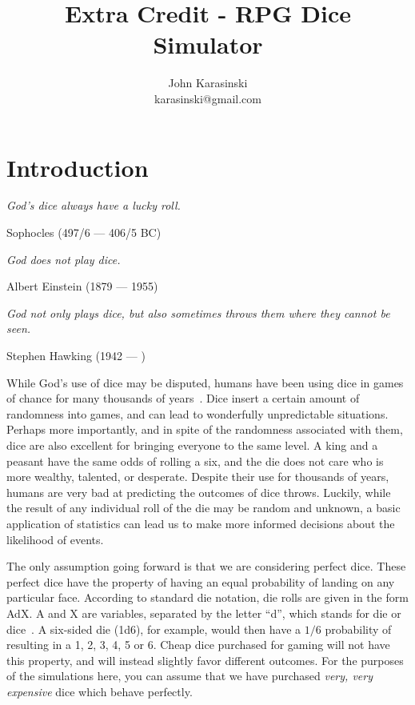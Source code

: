 \documentclass[twocolumn,letterpaper]{article}  %
\begin{document}
\title{Extra Credit - RPG Dice Simulator}
\author{%
John Karasinski\\
karasinski@gmail.com
}
\date{}

\maketitle

\thispagestyle{plain}
\pagestyle{plain}

\section{Introduction}

\epigraph{\small\itshape God's dice always have a lucky roll.}{Sophocles (497/6 --- 406/5 BC)}%
\vspace{-2em}
\epigraph{\small\itshape God does not play dice.}{Albert Einstein (1879 --- 1955)}%
\vspace{-2em}
\epigraph{\small\itshape God not only plays dice, but also sometimes throws them where they cannot be seen.}{Stephen Hawking (1942 --- \hspace{1.5em})}%

While God's use of dice may be disputed, humans have been using dice in games of chance for many thousands of years~\cite{history}. Dice insert a certain amount of randomness into games, and can lead to wonderfully unpredictable situations. Perhaps more importantly, and in spite of the randomness associated with them, dice are also excellent for bringing everyone to the same level. A king and a peasant have the same odds of rolling a six, and the die does not care who is more wealthy, talented, or desperate. Despite their use for thousands of years, humans are very bad at predicting the outcomes of dice throws. Luckily, while the result of any individual roll of the die may be random and unknown, a basic application of statistics can lead us to make more informed decisions about the likelihood of events.

The only assumption going forward is that we are considering perfect dice. These perfect dice have the property of having an equal probability of landing on any particular face. According to standard die notation, die rolls are given in the form AdX. A and X are variables, separated by the letter ``d'', which stands for die or dice~\cite{dice_notation}. A six-sided die (1d6), for example, would then have a $1/6$ probability of resulting in a 1, 2, 3, 4, 5 or 6. Cheap dice purchased for gaming will not have this property, and will instead slightly favor different outcomes. For the purposes of the simulations here, you can assume that we have purchased \textit{very, very expensive} dice which behave perfectly.
\end{document}
